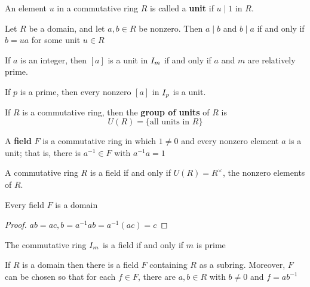 \documentclass[11pt]{article}
\begin{document}
\begin{definition}[]
An element \(u\) in a commutative ring \(R\) is called a \textbf{unit} if \(u\mid 1\) in \(R\).
\end{definition}

\begin{proposition}[]
Let \(R\) be a domain, and let \(a,b\in R\) be nonzero. Then \(a\mid b\) and
\(b\mid a\) if and only if \(b=ua\) for some unit \(u\in R\)
\end{proposition}

\begin{proposition}[]
If \(a\) is an integer, then \([a]\) is a unit in \(\relax{I}_m\) if and only if
\(a\) and \(m\) are relatively prime. 
\end{proposition}

\begin{corollary}[]
If \(p\) is a prime, then every nonzero \([a]\) in \(\relax{I}_p\) is a unit.
\end{corollary}

\begin{definition}[]
If \(R\) is a commutative ring, then the \textbf{group of units} of \(R\) is
\begin{equation*}
U(R)=\{\text{all units in }R\}
\end{equation*}
\end{definition}

\begin{definition}[]
A \textbf{field} \(F\) is a commutative ring in which \(1\neq0\) and every nonzero element
\(a\) is a unit; that is, there is \(a^{-1}\in F\) with \(a^{-1}a=1\)
\end{definition}
A commutative ring \(R\) is a field if and only if \(U(R)=R^{\times}\), the
nonzero elements of \(R\).

\begin{proposition}[]
Every field \(F\) is a domain
\end{proposition}
\begin{proof}
\(ab=ac,b=a^{-1}ab=a^{-1}(ac)=c\)
\end{proof}

\begin{proposition}[]
The commutative ring \(\relax{I}_m\) is a field if and only if \(m\) is prime
\end{proposition}

\begin{theorem}[]
\label{thm3.13}
If \(R\) is a domain then there is a field \(F\) containing \(R\) as a subring.
Moreover, \(F\) can be chosen so that for each \(f\in  F\), there are \(a,b\in
   R\) with 
\(b\neq 0\) and \(f=ab^{-1}\) 
\end{theorem}
\end{document}
